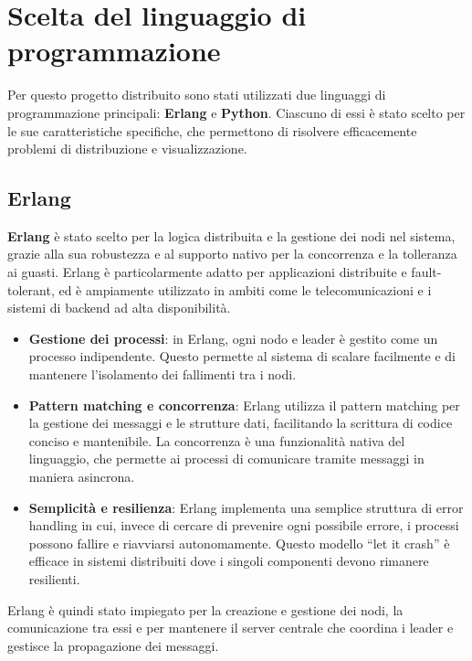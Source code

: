 \documentclass[12pt, a4paper]{report}
\begin{document}
\section{Scelta del linguaggio di programmazione}

Per questo progetto distribuito sono stati utilizzati due linguaggi di programmazione principali: \textbf{Erlang} e \textbf{Python}. Ciascuno di essi è stato scelto per le sue caratteristiche specifiche, che permettono di risolvere efficacemente problemi di distribuzione e visualizzazione.

\subsection{Erlang}

\textbf{Erlang} è stato scelto per la logica distribuita e la gestione dei nodi nel sistema, grazie alla sua robustezza e al supporto nativo per la concorrenza e la tolleranza ai guasti. Erlang è particolarmente adatto per applicazioni distribuite e fault-tolerant, ed è ampiamente utilizzato in ambiti come le telecomunicazioni e i sistemi di backend ad alta disponibilità.

\begin{itemize}
    \item \textbf{Gestione dei processi}: in Erlang, ogni nodo e leader è gestito come un processo indipendente. Questo permette al sistema di scalare facilmente e di mantenere l'isolamento dei fallimenti tra i nodi.
    \item \textbf{Pattern matching e concorrenza}: Erlang utilizza il pattern matching per la gestione dei messaggi e le strutture dati, facilitando la scrittura di codice conciso e mantenibile. La concorrenza è una funzionalità nativa del linguaggio, che permette ai processi di comunicare tramite messaggi in maniera asincrona.
    \item \textbf{Semplicità e resilienza}: Erlang implementa una semplice struttura di error handling in cui, invece di cercare di prevenire ogni possibile errore, i processi possono fallire e riavviarsi autonomamente. Questo modello “let it crash” è efficace in sistemi distribuiti dove i singoli componenti devono rimanere resilienti.
\end{itemize}

Erlang è quindi stato impiegato per la creazione e gestione dei nodi, la comunicazione tra essi e per mantenere il server centrale che coordina i leader e gestisce la propagazione dei messaggi.
\end{document}
